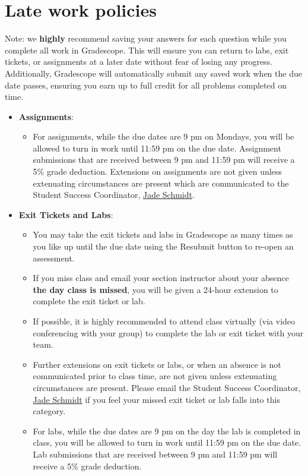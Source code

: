\documentclass[
]{article}
\providecommand{\tightlist}{%
  \setlength{\itemsep}{0pt}\setlength{\parskip}{0pt}}
\begin{document}
\section{Late work policies}\label{late-work-policies}

Note: we \textbf{highly} recommend saving your answers for each question
while you complete all work in Gradescope. This will ensure you can
return to labs, exit tickets, or assignments at a later date without
fear of losing any progress. Additionally, Gradescope will automatically
submit any saved work when the due date passes, ensuring you earn up to
full credit for all problems completed on time.

\begin{itemize}
\tightlist
\item
  \textbf{Assignments}:

  \begin{itemize}
  \tightlist
  \item
    For assignments, while the due dates are 9 pm on Mondays, you will
    be allowed to turn in work until 11:59 pm on the due date.
    Assignment submissions that are received between 9 pm and 11:59 pm
    will receive a 5\% grade deduction. Extensions on assignments are
    not given unless extenuating circumstances are present which are
    communicated to the Student Success Coordinator,
    \href{jade.schmidt2@montana.edu}{Jade Schmidt}.
  \end{itemize}
\item
  \textbf{Exit Tickets and Labs}:

  \begin{itemize}
  \tightlist
  \item
    You may take the exit tickets and labs in Gradescope as many times
    as you like up until the due date using the Resubmit button to
    re-open an assessment.
  \item
    If you miss class and email your section instructor about your
    absence \textbf{the day class is missed}, you will be given a
    24-hour extension to complete the exit ticket or lab.
  \item
    If possible, it is highly recommended to attend class virtually (via
    video conferencing with your group) to complete the lab or exit
    ticket with your team.\\
  \item
    Further extensions on exit tickets or labs, or when an absence is
    not communicated prior to class time, are not given unless
    extenuating circumstances are present. Please email the Student
    Success Coordinator, \href{jade.schmidt2@montana.edu}{Jade Schmidt}
    if you feel your missed exit ticket or lab falls into this category.
  \item
    For labs, while the due dates are 9 pm on the day the lab is
    completed in class, you will be allowed to turn in work until 11:59
    pm on the due date. Lab submissions that are received between 9 pm
    and 11:59 pm will receive a 5\% grade deduction.
  \end{itemize}
\end{itemize}
\end{document}
